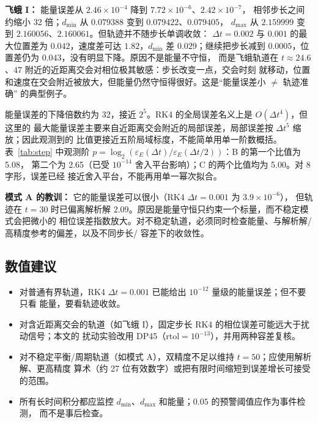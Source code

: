 \documentclass[UTF8,fontset=windows,11pt,a4paper]{ctexart}
\begin{document}
\textbf{飞蛾 I：} 能量误差从 $2.46\times10^{-4}$ 降到 $7.72\times10^{-6}$、$2.42\times10^{-7}$，
相邻步长之间约缩小 32 倍；$d_{\min}$ 从 $0.079388$ 变到 $0.079422$、$0.079405$，
$d_{\max}$ 从 $2.159999$ 变到 $2.160056$、$2.160061$。但轨迹并不随步长单调收敛：
$\Delta t=0.002$ 与 $0.001$ 的最大位置差为 $0.042$，速度差可达 $1.82$，$d_{\min}$ 差
$0.029$；继续把步长减到 $0.0005$，位置差仍为 $0.043$，没有明显下降。原因不是能量不守恒，
而是飞蛾轨道在 $t\approx24.6$、$47$ 附近的近距离交会对相位极其敏感：步长改变一点，交会时刻
就移动，位置和速度在交会附近被放大，但能量仍然守恒得很好。这是“能量误差小 $\ne$ 轨迹准确”
的典型例子。

能量误差的下降倍数约为 32，接近 $2^5$。RK4 的全局误差名义上是 $O(\Delta t^4)$，但这里的
最大能量误差主要来自近距离交会附近的局部误差，局部误差按 $\Delta t^5$ 缩放；因此观测到的
比值更接近五阶局域标度，不能简单用单一阶数概括。表~\ref{tab:step} 中观测阶
$p=\log_2(\varepsilon_E(\Delta t)/\varepsilon_E(\Delta t/2))$：B 的第一个比值为 5.08，
第二个为 2.65（已受 $10^{-14}$ 舍入平台影响）；C 的两个比值均为 5.00。对 8 字形，误差已经
接近舍入平台，不能再用单一幂次拟合。

\textbf{模式 A 的教训：} 它的能量误差可以很小（RK4 $\Delta t=0.001$ 为 $3.9\times10^{-6}$），
但轨迹在 $t=30$ 时已偏离解析解 $2.09$。原因是能量守恒只约束一个标量，而不稳定模式会把微小的
相位误差指数放大。对不稳定轨道，必须同时检查能量、与解析解/高精度参考的偏差，以及不同步长/
容差下的收敛性。

\subsection{数值建议}
\begin{itemize}[leftmargin=2em,itemsep=2pt]
\item 对普通有界轨道，RK4 $\Delta t=0.001$ 已能给出 $10^{-12}$ 量级的能量误差；但不要只看
能量，要看轨迹收敛。
\item 对含近距离交会的轨道（如飞蛾 I），固定步长 RK4 的相位误差可能远大于扰动信号；本文的
扰动实验改用 DP45（$\mathrm{rtol}=10^{-13}$），并用两种容差复核。
\item 对不稳定平衡/周期轨道（如模式 A），双精度不足以维持 $t=50$；应使用解析解、更高精度
算术（约 27 位有效数字）或把有限时间缩短到误差增长可接受的范围。
\item 所有长时间积分都应监控 $d_{\min}$、$d_{\max}$ 和能量；$0.05$ 的预警阈值应作为事件检测，
而不是事后检查。
\end{itemize}

\end{document}
